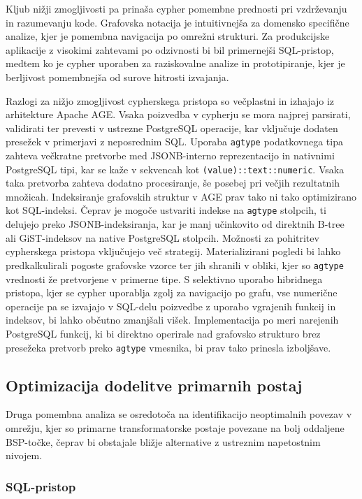 \documentclass[a4paper,12pt,openright]{book}
\begin{document}
Kljub nižji zmogljivosti pa prinaša cypher pomembne prednosti pri vzdrževanju in razumevanju kode. Grafovska notacija je intuitivnejša za domensko specifične analize, kjer je pomembna navigacija po omrežni strukturi. Za produkcijske aplikacije z visokimi zahtevami po odzivnosti bi bil primernejši SQL-pristop, medtem ko je cypher uporaben za raziskovalne analize in prototipiranje, kjer je berljivost pomembnejša od surove hitrosti izvajanja.

Razlogi za nižjo zmogljivost cypherskega pristopa so večplastni in izhajajo iz arhitekture Apache AGE. Vsaka poizvedba v cypherju se mora najprej parsirati, validirati ter prevesti v ustrezne PostgreSQL operacije, kar vključuje dodaten presežek v primerjavi z neposrednim SQL. Uporaba \texttt{agtype} podatkovnega tipa zahteva večkratne pretvorbe med JSONB-interno reprezentacijo in nativnimi PostgreSQL tipi, kar se kaže v sekvencah kot \texttt{(value)::text::numeric}. Vsaka taka pretvorba zahteva dodatno procesiranje, še posebej pri večjih rezultatnih množicah. Indeksiranje grafovskih struktur v AGE prav tako ni tako optimizirano kot SQL-indeksi. Čeprav je mogoče ustvariti indekse na \texttt{agtype} stolpcih, ti delujejo preko JSONB-indeksiranja, kar je manj učinkovito od direktnih B-tree ali GiST-indeksov na native PostgreSQL stolpcih. Možnosti za pohitritev cypherskega pristopa vključujejo več strategij. Materializirani pogledi bi lahko predkalkulirali pogoste grafovske vzorce ter jih shranili v obliki, kjer so \texttt{agtype} vrednosti že pretvorjene v primerne tipe. S selektivno uporabo hibridnega pristopa, kjer se cypher uporablja zgolj za navigacijo po grafu, vse numerične operacije pa se izvajajo v SQL-delu poizvedbe z uporabo vgrajenih funkcij in indeksov, bi lahko občutno zmanjšali višek. Implementacija po meri narejenih PostgreSQL funkcij, ki bi direktno operirale nad grafovsko strukturo brez presežeka pretvorb preko \texttt{agtype} vmesnika, bi prav tako prinesla izboljšave. 

\subsection{Optimizacija dodelitve primarnih postaj}

Druga pomembna analiza se osredotoča na identifikacijo neoptimalnih povezav v omrežju, kjer so primarne transformatorske postaje povezane na bolj oddaljene BSP-točke, čeprav bi obstajale bližje alternative z ustreznim napetostnim nivojem.

\subsubsection{SQL-pristop}
\end{document}
